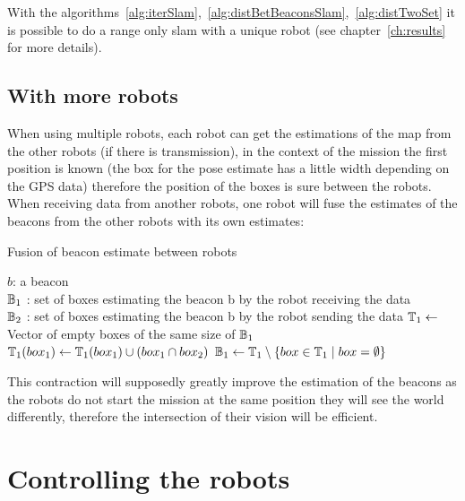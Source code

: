 With the algorithms~\ref{alg:iterSlam},~\ref{alg:distBetBeaconsSlam},~\ref{alg:distTwoSet} it is possible to do a range only slam with a unique robot (see chapter~\ref{ch:results} for more details).

\subsection{With more robots}

When using multiple robots, each robot can get the estimations of the map from the other robots (if there is transmission), in the context of the mission the first position is known (the box for the pose estimate has a little width depending on the GPS data) therefore the position of the boxes is sure between the robots. When receiving data from another robots, one robot will fuse the estimates of the beacons from the other robots with its own estimates:

\begin{algorithm}[H]
\caption{Fusion of beacon estimate between robots}
\label{alg:fuseDataRobotSet}
\begin{algorithmic}[1]
\REQUIRE $b$: a beacon\\
   $\mathbb{B_{\textnormal{1}}}$ : set of boxes estimating the beacon b by the robot receiving the data\\
   $\mathbb{B_{\textnormal{2}}}$ : set of boxes estimating the beacon b by the robot sending the data
\STATE $\mathbb{T_{\textnormal{1}}} \leftarrow$ Vector of empty boxes of the same size of $\mathbb{B_{\textnormal{1}}}$
\STATE $\mathbb{T_{\textnormal{1}}}(box_1) \leftarrow  \mathbb{T_{\textnormal{1}}}(box_1)  \cup (box_{1} \cap box_{2})$
\ENDFOR
\ENDFOR
\STATE $\mathbb{B_{\textnormal{1}}} \leftarrow \mathbb{T_{\textnormal{1}}}\setminus\{box \in \mathbb{T_{\textnormal{1}}} \mid box = \emptyset \}$
\end{algorithmic}
\end{algorithm}

This contraction will supposedly greatly improve the estimation of the beacons as the robots do not start the mission at the same position they will see the world differently, therefore the intersection of their vision will be efficient.

\section{Controlling the robots}

